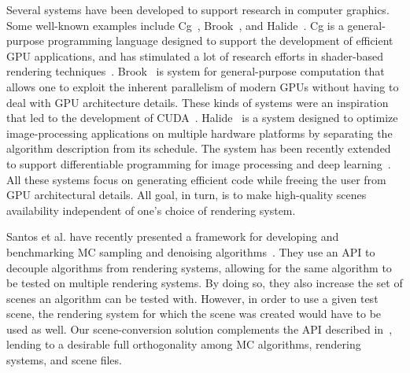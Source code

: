 Several systems have been developed to support research in computer graphics. 
Some well-known examples include Cg~\cite{Mark2003}, Brook~\cite{Buck2004}, and Halide~\cite{Ragan-Kelley2012}.
Cg is a general-purpose programming language designed to support the development of efficient GPU applications, and has stimulated a lot of research efforts in shader-based rendering techniques~\cite{Policarpo2005, Policarpo2006, Wyman2005, Oliveira2007RRT}.  
Brook~\cite{Buck2004} is system for general-purpose computation that allows one to exploit the inherent parallelism of modern GPUs without having to deal with GPU architecture details. These kinds of systems were an inspiration that led to the development of CUDA~\cite{Nickolls2008}.
Halide~\cite{Ragan-Kelley2012} is a system designed to optimize image-processing applications on multiple hardware platforms by separating the algorithm description from its schedule. The system has been recently extended to support differentiable programming for image processing and deep learning~\cite{Li2018-Halide-Diff_Prog}. All these systems focus on generating efficient code while freeing the user from GPU architectural details. All goal, in turn, is to make high-quality scenes availability independent of one's choice of rendering system. 

Santos et al. have recently presented a framework for developing and benchmarking MC sampling and denoising algorithms~\cite{Santos:2018:FBKSD}.
They use an API to decouple algorithms from rendering systems, allowing for the same algorithm to be tested on multiple rendering systems. By doing so, they also increase the set of scenes an algorithm can be tested with. However, in order to use a given test scene, the rendering system for which the scene was created would have to be used as well. Our scene-conversion solution complements the API described in~\cite{Santos:2018:FBKSD}, lending to a desirable full orthogonality among MC algorithms, rendering systems, and scene files.

